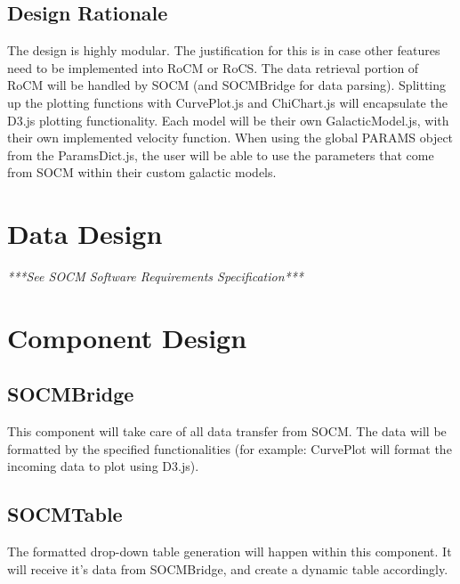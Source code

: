 \documentclass[titlepage]{article}
\begin{document}



\subsection{Design Rationale}
The design is highly modular. The justification for this is in case other features need to be implemented into RoCM or RoCS. The data retrieval portion of RoCM will be handled by SOCM (and SOCMBridge for data parsing). Splitting up the plotting functions with CurvePlot.js and ChiChart.js will encapsulate the D3.js plotting functionality. Each model will be their own GalacticModel.js, with their own implemented velocity function. When using the global PARAMS object from the ParamsDict.js, the user will be able to use the parameters that come from SOCM within their custom galactic models.

\section{Data Design}
\textit{***See SOCM Software Requirements Specification***}

\section{Component Design}
\subsection{SOCMBridge}
This component will take care of all data transfer from SOCM. The data will be formatted by the specified functionalities (for example: CurvePlot will format the incoming data to plot using D3.js).


\subsection{SOCMTable}
The formatted drop-down table generation will happen within this component. It will receive it's data from SOCMBridge, and create a dynamic table accordingly.
\end{document}
